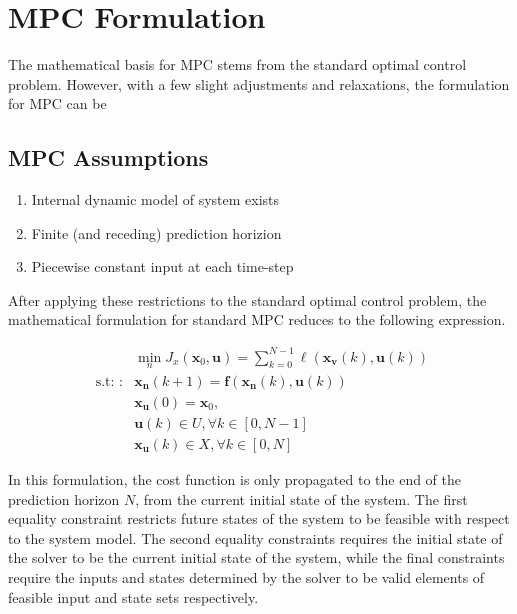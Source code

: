 \documentclass[journal]{IEEEtran}
\begin{document}
\subsection{}

\subsection{}

\section{MPC Formulation}

The mathematical basis for MPC stems from the standard optimal control problem. However, with a few slight adjustments and relaxations, the formulation for MPC can be


\subsection{MPC Assumptions}

\begin{enumerate}
  \item Internal dynamic model of system exists
  \item Finite (and receding) prediction horizion
  \item Piecewise constant input at each time-step \\
\end{enumerate}

After applying these restrictions to the standard optimal control problem, the mathematical formulation for standard MPC reduces to the following expression.

\begin{equation}
\begin{aligned}
& \min _{n} J_{x}\left(\mathbf{x}_{0}, \mathbf{u}\right)=\sum_{k=0}^{N-1} \ell\left(\mathbf{x}_{\mathbf{v}}(k), \mathbf{u}(k)\right) \\
\text { s.t: }: & \mathbf{x}_{\mathbf{n}}(k+1)=\mathbf{f}\left(\mathbf{x}_{\mathbf{n}}(k), \mathbf{u}(k)\right) \\
& \mathbf{x}_{\mathbf{u}}(0)=\mathbf{x}_{0}, \\
& \mathbf{u}(k) \in U, \forall k \in[0, N-1] \\
& \mathbf{x}_{\mathbf{u}}(k) \in X, \forall k \in[0, N]
\end{aligned}
\end{equation}

In this formulation, the cost function is only propagated to the end of the prediction horizon $N$, from the current initial state of the system. The first equality constraint restricts future states of the system to be feasible with respect to the system model. The second equality constraints requires the initial state of the solver to be the current initial state of the system, while the final constraints require the inputs and states determined by the solver to be valid elements of feasible input and state sets respectively. \\
\end{document}
